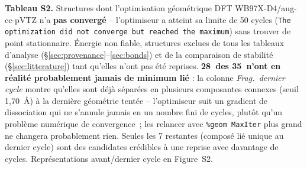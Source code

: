 \noindent\textbf{Tableau S2.} Structures dont l'optimisation g\'eom\'etrique DFT WB97X-D4/aug-cc-pVTZ n'a \textbf{pas converg\'e} -- l'optimiseur a atteint sa limite de 50 cycles (\texttt{The optimization did not converge but reached the maximum}) sans trouver de point stationnaire. \'Energie non fiable, structures exclues de tous les tableaux d'analyse (\S\ref{sec:provenance}--\ref{sec:bonds}) et de la comparaison de stabilit\'e (\S\ref{sec:litterature}) tant qu'elles n'ont pas \'et\'e reprises. \textbf{28~des 35~n'ont en r\'ealit\'e probablement jamais de minimum li\'e} : la colonne \emph{Frag.\ dernier cycle} montre qu'elles sont d\'ej\`a s\'epar\'ees en plusieurs composantes connexes (seuil 1,70~\AA) \`a la derni\`ere g\'eom\'etrie tent\'ee -- l'optimiseur suit un gradient de dissociation qui ne s'annule jamais en un nombre fini de cycles, plut\^ot qu'un probl\`eme num\'erique de convergence~; les relancer avec \texttt{\%geom MaxIter} plus grand ne changera probablement rien. Seules les 7 restantes (compos\'e li\'e unique au dernier cycle) sont des candidates cr\'edibles \`a une reprise avec davantage de cycles. Repr\'esentations avant/dernier cycle en Figure~S2.\par\vspace{4pt}

